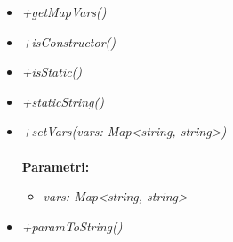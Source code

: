 \begin{itemize}
\begin{itemize}
    		\item \emph{+getMapVars()}\\
    		
    		\item \emph{+isConstructor()}\\
    		
    		\item \emph{+isStatic()}\\
    		
    		\item \emph{+staticString()}\\
    		
    		\item \emph{+setVars(vars: Map<string, string>)}\\
    		\\
    		\textbf{Parametri:}
    		\begin{itemize}
    			\item \emph{vars: Map<string, string>}\\
    			
    		\end{itemize}
    		\item \emph{+paramToString()}\\
    		
    	\end{itemize}
\end{itemize}